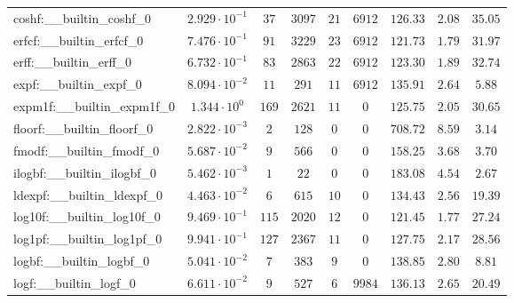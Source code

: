 \begin{tabular}{|l|c|c|c|c|c|c|c|c|}
coshf:\_\_builtin\_coshf\_0               & $ 2.929 \cdot 10^{-1} $ & $ 37     $ & $ 3097  $ & $ 21  $ & $ 6912   $ & $ 126.33      $ & $ 2.08    $ & $ 35.05   $ \\
erfcf:\_\_builtin\_erfcf\_0               & $ 7.476 \cdot 10^{-1} $ & $ 91     $ & $ 3229  $ & $ 23  $ & $ 6912   $ & $ 121.73      $ & $ 1.79    $ & $ 31.97   $ \\
erff:\_\_builtin\_erff\_0                 & $ 6.732 \cdot 10^{-1} $ & $ 83     $ & $ 2863  $ & $ 22  $ & $ 6912   $ & $ 123.30      $ & $ 1.89    $ & $ 32.74   $ \\
expf:\_\_builtin\_expf\_0                 & $ 8.094 \cdot 10^{-2} $ & $ 11     $ & $ 291   $ & $ 11  $ & $ 6912   $ & $ 135.91      $ & $ 2.64    $ & $ 5.88    $ \\
expm1f:\_\_builtin\_expm1f\_0             & $ 1.344 \cdot 10^{0}  $ & $ 169    $ & $ 2621  $ & $ 11  $ & $ 0      $ & $ 125.75      $ & $ 2.05    $ & $ 30.65   $ \\
floorf:\_\_builtin\_floorf\_0             & $ 2.822 \cdot 10^{-3} $ & $ 2      $ & $ 128   $ & $ 0   $ & $ 0      $ & $ 708.72      $ & $ 8.59    $ & $ 3.14    $ \\
fmodf:\_\_builtin\_fmodf\_0               & $ 5.687 \cdot 10^{-2} $ & $ 9      $ & $ 566   $ & $ 0   $ & $ 0      $ & $ 158.25      $ & $ 3.68    $ & $ 3.70    $ \\
ilogbf:\_\_builtin\_ilogbf\_0             & $ 5.462 \cdot 10^{-3} $ & $ 1      $ & $ 22    $ & $ 0   $ & $ 0      $ & $ 183.08      $ & $ 4.54    $ & $ 2.67    $ \\
ldexpf:\_\_builtin\_ldexpf\_0             & $ 4.463 \cdot 10^{-2} $ & $ 6      $ & $ 615   $ & $ 10  $ & $ 0      $ & $ 134.43      $ & $ 2.56    $ & $ 19.39   $ \\
log10f:\_\_builtin\_log10f\_0             & $ 9.469 \cdot 10^{-1} $ & $ 115    $ & $ 2020  $ & $ 12  $ & $ 0      $ & $ 121.45      $ & $ 1.77    $ & $ 27.24   $ \\
log1pf:\_\_builtin\_log1pf\_0             & $ 9.941 \cdot 10^{-1} $ & $ 127    $ & $ 2367  $ & $ 11  $ & $ 0      $ & $ 127.75      $ & $ 2.17    $ & $ 28.56   $ \\
logbf:\_\_builtin\_logbf\_0               & $ 5.041 \cdot 10^{-2} $ & $ 7      $ & $ 383   $ & $ 9   $ & $ 0      $ & $ 138.85      $ & $ 2.80    $ & $ 8.81    $ \\
logf:\_\_builtin\_logf\_0                 & $ 6.611 \cdot 10^{-2} $ & $ 9      $ & $ 527   $ & $ 6   $ & $ 9984   $ & $ 136.13      $ & $ 2.65    $ & $ 20.49   $ \\

\end{tabular}
